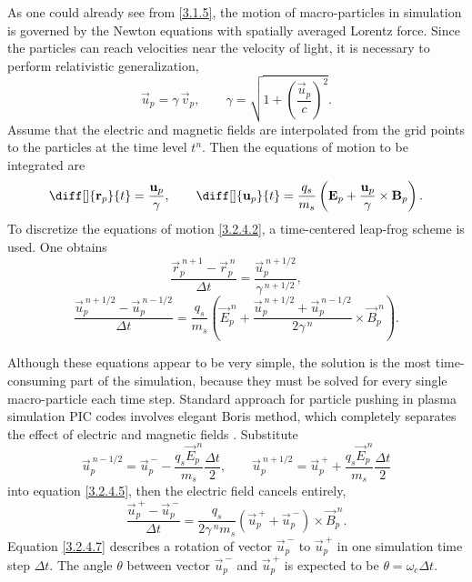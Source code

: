 As one could already see from \ref{3.1.5}, the motion of macro-particles in simulation is governed by the Newton equations with spatially averaged Lorentz force. Since the particles can reach velocities near the velocity of light, it is necessary to perform relativistic generalization,
\begin{equation}
\label{3.2.4.1}
\vec{u}_{p} = \gamma \, \vec{v}_{p}, \qquad \gamma = \sqrt{1 + \left( \frac{\vec{u}_{p}}{c}\right)^{2}}.
\end{equation}
Assume that the electric and magnetic fields are interpolated from the grid points to the particles at the time level $ t^{n} $. Then the equations of motion to be integrated are
\begin{equation}
\label{3.2.4.2}
\diff[]{\vec{r}_{p}}{t} = \frac{\vec{u}_{p}}{\gamma}, \qquad \diff[]{\vec{u}_{p}}{t} = \frac{q_{s}}{m_{s}} \left(\vec{E}_{p} + \frac{\vec{u}_{p}}{\gamma} \times \vec{B}_{p} \right).
\end{equation}
To discretize the equations of motion \ref{3.2.4.2}, a time-centered leap-frog scheme is used. One obtains
\begin{equation}
\label{3.2.4.4}
\frac{\vec{r}_{p}^{\:n+1} - \vec{r}_{p}^{\:n}}{\Delta t} = \frac{\vec{u}_{p}^{\:n + 1/2}}{\gamma^{\:n+1/2}},
\end{equation}
\begin{equation}
\label{3.2.4.5}
\frac{\vec{u}_{p}^{\:n+1/2} - \vec{u}_{p}^{\:n-1/2}}{\Delta t} = \frac{q_{s}}{m_{s}} \left( \vec{E}_{p}^{\:n} + \frac{\vec{u}_{p}^{\:n+1/2} + \vec{u}_{p}^{\:n-1/2}}{2 \gamma^{\:n}} \times \vec{B}_{p}^{\:n} \right).
\end{equation}

Although these equations appear to be very simple, the solution is the most time-consuming part of the simulation, because they must be solved for every single macro-particle each time step. Standard approach for particle pushing in plasma simulation PIC codes involves elegant Boris method, which completely separates the effect of electric and magnetic fields \cite{birdsall}. Substitute
\begin{equation}
\label{3.2.4.6}
\vec{u}_{p}^{\:n-1/2} = \vec{u}_{p}^{\:-} - \frac{q_{s} \vec{E}_{p}^{\:n}}{m_{s}} \frac{\Delta t}{2}, \qquad \vec{u}_{p}^{\:n+1/2} = \vec{u}_{p}^{\:+} + \frac{q_{s} \vec{E}_{p}^{\:n}}{m_{s}} \frac{\Delta t}{2}
\end{equation}
into equation \ref{3.2.4.5}, then the electric field cancels entirely,
\begin{equation}
\label{3.2.4.7}
\frac{\vec{u}_{p}^{\:+} - \vec{u}_{p}^{\:-}}{\Delta t} = \frac{q_{s}}{2 \gamma^{\:n} m_{s}} \left(\vec{u}_{p}^{\:+} + \vec{u}_{p}^{\:-}\right)\times \vec{B}_{p}^{\:n}. 
\end{equation}
Equation \ref{3.2.4.7} describes a rotation of vector $ \vec{u}_{p}^{\:-} $ to $ \vec{u}_{p}^{\:+} $ in one simulation time step $ \Delta t $. The angle $ \theta $ between vector $ \vec{u}_{p}^{\:-} $ and $ \vec{u}_{p}^{\:+} $ is expected to be $ \theta = \omega_{c} \Delta t $.

